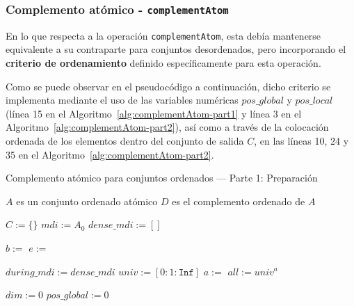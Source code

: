 \newpage
\subsubsection{Complemento atómico - \texttt{complementAtom}}

En lo que respecta a la operación \texttt{complementAtom}, esta debía mantenerse equivalente a su contraparte para conjuntos desordenados, pero incorporando el \textbf{criterio de ordenamiento} definido específicamente para esta operación.

Como se puede observar en el pseudocódigo a continuación, dicho criterio se implementa mediante el uso de las variables numéricas $pos\_global$ y $pos\_local$ (línea 15 en el Algoritmo~\ref{alg:complementAtom-part1} y línea 3 en el Algoritmo~\ref{alg:complementAtom-part2}), así como a través de la colocación ordenada de los elementos dentro del conjunto de salida $C$, en las líneas 10, 24 y 35 en el Algoritmo~\ref{alg:complementAtom-part2}.

\begin{algorithm}
\caption{Complemento atómico para conjuntos ordenados — Parte 1: Preparación}\label{alg:complementAtom-part1}
\begin{algorithmic}[1]
\Require $A$ es un conjunto ordenado atómico
\Ensure $D$ es el complemento ordenado de $A$

  \State $C := \{\}$  
  \State $mdi := A_0$  
  \State $dense\_mdi := []$

    \State $b :=$ 
    \State $e :=$ 
    \State {}
  \EndFor

  \State $during\_mdi := dense\_mdi$
  \State $univ := [0:1:\texttt{Inf}]$
  \State $a :=$ 
  \State $all := univ^a$ 

  \State $dim := 0$
  \State $pos\_global := 0$
\EndFunction
\end{algorithmic}
\end{algorithm}


